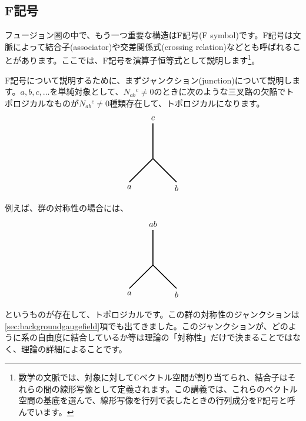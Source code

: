 \documentclass[report,paper=a4, fontsize=12pt, line_length=16cm, number_of_lines=33,dvipdfmx]{jlreq}
\numberwithin{equation}{chapter}
\newcommand{\Cb}{\mathbb{C}}
\begin{document}
\subsection{F記号}
フュージョン圏の中で、もう一つ重要な構造はF記号(F symbol)です。F記号は文脈によって結合子(associator)や交差関係式(crossing relation)などとも呼ばれることがあります。ここでは、F記号を演算子恒等式として説明します\footnote{数学の文脈では、対象に対して$\Cb$ベクトル空間が割り当てられ、結合子はそれらの間の線形写像として定義されます。この講義では、これらのベクトル空間の基底を選んで、線形写像を行列で表したときの行列成分をF記号と呼んでいます。}。

F記号について説明するために、まずジャンクション(junction)について説明します。$a,b,c,\dots$を単純対象として、$N_{ab}{}^{c}\ne 0$のときに次のような三叉路の欠陥でトポロジカルなものが$N_{ab}{}^{c}\ne 0$種類存在して、トポロジカルになります。
\begin{align}
  \begin{tikzpicture}
    \draw[very thick](0,0)--(0,1.5) node[above]{$c$};
    \draw[very thick](0,0)--(-1,-1) node[below]{$a$};
    \draw[very thick](0,0)--(1,-1) node[below]{$b$};
  \end{tikzpicture}    
\end{align}
例えば、群の対称性の場合には、
\begin{align}
  \begin{tikzpicture}
    \draw[very thick](0,0)--(0,1.5) node[above]{$ab$};
    \draw[very thick](0,0)--(-1,-1) node[below]{$a$};
    \draw[very thick](0,0)--(1,-1) node[below]{$b$};
  \end{tikzpicture}    
\end{align}
というものが存在して、トポロジカルです。この群の対称性のジャンクションは\ref{sec:backgroundgaugefield}項でも出てきました。このジャンクションが、どのように系の自由度に結合しているか等は理論の「対称性」だけで決まることではなく、理論の詳細によることです。
\end{document}
